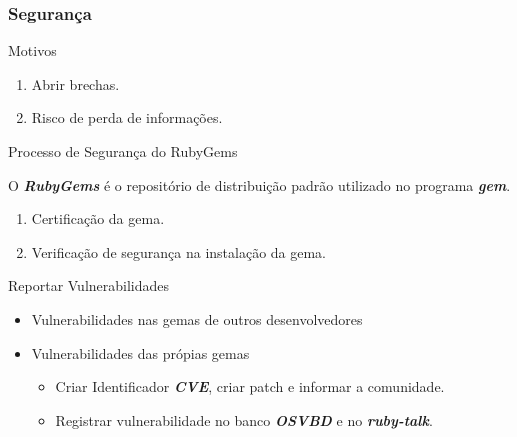 \begin{frame}
 \frametitle{Segurança}

  \begin{block}{Motivos}

   \begin{enumerate}

    \item Abrir brechas.

    \item Risco de perda de informações.

   \end{enumerate}

  \end{block}

  \begin{block}{Processo de Segurança do RubyGems}

   O \emph{\textbf{RubyGems}} é o repositório de distribuição padrão utilizado no
   programa \emph{\textbf{gem}}.

   \begin{enumerate}

    \item Certificação da gema.

    \item Verificação de segurança na instalação da gema.

   \end{enumerate}

  \end{block}

  \begin{block}{Reportar Vulnerabilidades}

   \begin{itemize}

    \item Vulnerabilidades nas gemas de outros desenvolvedores

    \item Vulnerabilidades das própias gemas
    
    \begin{itemize}
     \item Criar Identificador \emph{\textbf{CVE}}, criar patch e informar a comunidade.
     \item Registrar vulnerabilidade no banco \emph{\textbf{OSVBD}} e no \emph{\textbf{ruby-talk}}.
    \end{itemize}


   \end{itemize}

  \end{block}

\end{frame}


